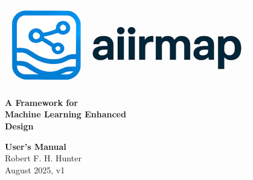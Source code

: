 \begin{titlepage}
    \thispagestyle{empty} %
    \vspace*{0.15\textheight}

    \begin{center}
        \includegraphics[width=0.8\textwidth]{aiirmap_logo_cropped} %
    \end{center}
    
    \vspace{-1em}
    \begin{center}
        {\Huge \textbf{A Framework for}}\\[0.7em]
        {\Huge \textbf{Machine Learning Enhanced}}\\[0.5em]
        {\Huge \textbf{Design}}

        
    \end{center}
    
   \vspace*{0.2\textheight}
    
    \begin{center}
        \begin{spacing}{2}
				{\Huge \bfseries User's Manual} \\ [0.5cm]
				{\Large Robert F. H. Hunter} \\
				{\Large August 2025, v1}
		\end{spacing}
    \end{center}
    
	
	

\end{titlepage}

